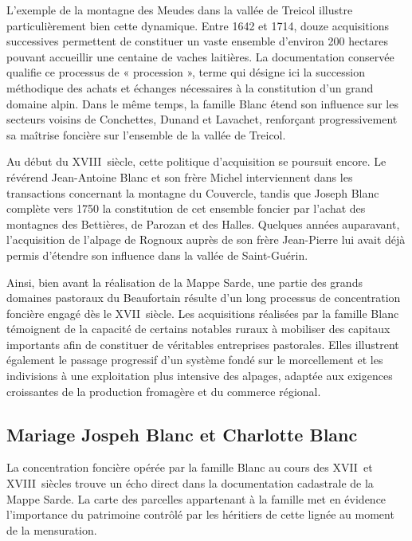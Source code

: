 \documentclass[12pt,a4paper]{report}
\begin{document}
	L'exemple de la montagne des Meudes dans la vallée de Treicol illustre particulièrement bien cette dynamique. Entre 1642 et 1714, douze acquisitions successives permettent de constituer un vaste ensemble d'environ 200 hectares pouvant accueillir une centaine de vaches laitières. La documentation conservée qualifie ce processus de « procession », terme qui désigne ici la succession méthodique des achats et échanges nécessaires à la constitution d'un grand domaine alpin. Dans le même temps, la famille Blanc étend son influence sur les secteurs voisins de Conchettes, Dunand et Lavachet, renforçant progressivement sa maîtrise foncière sur l'ensemble de la vallée de Treicol.
	
	Au début du XVIII\ieme\ siècle, cette politique d'acquisition se poursuit encore. Le révérend Jean-Antoine Blanc et son frère Michel interviennent dans les transactions concernant la montagne du Couvercle, tandis que Joseph Blanc complète vers 1750 la constitution de cet ensemble foncier par l'achat des montagnes des Bettières, de Parozan et des Halles. Quelques années auparavant, l'acquisition de l'alpage de Rognoux auprès de son frère Jean-Pierre lui avait déjà permis d'étendre son influence dans la vallée de Saint-Guérin.
	
	Ainsi, bien avant la réalisation de la Mappe Sarde, une partie des grands domaines pastoraux du Beaufortain résulte d'un long processus de concentration foncière engagé dès le XVII\ieme\ siècle. Les acquisitions réalisées par la famille Blanc témoignent de la capacité de certains notables ruraux à mobiliser des capitaux importants afin de constituer de véritables entreprises pastorales. Elles illustrent également le passage progressif d'un système fondé sur le morcellement et les indivisions à une exploitation plus intensive des alpages, adaptée aux exigences croissantes de la production fromagère et du commerce régional.
	
\subsection{Mariage Jospeh Blanc et Charlotte Blanc}	

La concentration foncière opérée par la famille Blanc au cours des XVII\ieme\ et XVIII\ieme\ siècles trouve un écho direct dans la documentation cadastrale de la Mappe Sarde. La carte des parcelles appartenant à la famille met en évidence l'importance du patrimoine contrôlé par les héritiers de cette lignée au moment de la mensuration.
\end{document}

